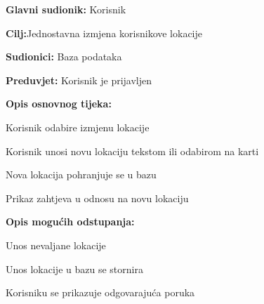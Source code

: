 			\noindent {}
			\begin{packed_item}
				
				\item \textbf{Glavni sudionik: }Korisnik
				\item  \textbf{Cilj:}Jednostavna izmjena korisnikove lokacije
				\item  \textbf{Sudionici:} Baza podataka
				\item  \textbf{Preduvjet:} Korisnik je prijavljen
				\item  \textbf{Opis osnovnog tijeka:}
				
				\item[] \begin{packed_enum}
					
					\item Korisnik odabire izmjenu lokacije
					\item Korisnik unosi novu lokaciju tekstom ili odabirom na karti
					\item Nova lokacija pohranjuje se u bazu
					\item Prikaz zahtjeva u odnosu na novu lokaciju
				\end{packed_enum}
				
				\item  \textbf{Opis mogućih odstupanja:}
				
				\item[] \begin{packed_item}
					
					\item[2.a] Unos nevaljane lokacije
					\item[] \begin{packed_enum}
						
						\item Unos lokacije u bazu se stornira
						\item Korisniku se prikazuje odgovarajuća poruka
						
					\end{packed_enum}
				
					
				\end{packed_item}
			\end{packed_item}
			
			
	
